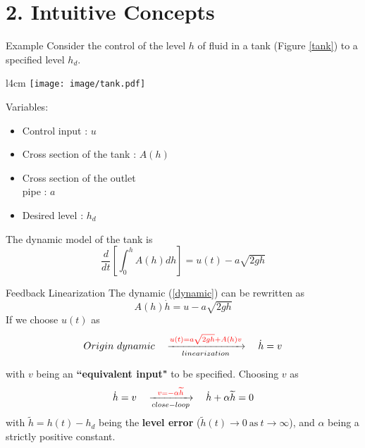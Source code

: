 \documentclass{beamer}
\begin{document}
  \section{2. Intuitive Concepts}

  \begin{frame}{Example}
    Consider the control of the level $h$ of fluid in a tank (Figure \ref{tank}) to a specified level $h_{d}$.

    \begin{wrapfigure}{l}{4cm}
    \vspace{-10pt}
    \texttt{[image: image/tank.pdf]}\\
    \vspace{-15pt}
    \caption{Fluid level control in a tank}\label{tank}
    \vspace{-10pt}
    \end{wrapfigure}

    Variables:
    \begin{itemize}
      \item Control input : $u$
      \item Cross section of the tank : $A(h)$
      \item Cross section of the outlet \\ pipe : $a$
      \item Desired level : $h_{d}$
    \end{itemize}

    The dynamic model of the tank is
    \begin{equation}\label{dynamic}
      \frac{d}{dt}\left[\int_{0}^{h}A(h)dh\right] = u(t) - a \sqrt{2gh}
    \end{equation}

  \end{frame}


  \begin{frame}{Feedback Linearization}
  The dynamic (\ref{dynamic}) can be rewritten as
  $$ A(h)\dot{h} = u-a\sqrt{2gh} $$
  If we choose $u(t)$ as
  $$
  Origin~dynamic \quad \xrightarrow[linearization]{{\color{red} u(t) = a\sqrt{2gh} + A(h)v}} \quad \dot{h}=v
  $$

  with $v$ being an \textbf{``equivalent input"} to be specified.
  Choosing $v$ as
  $$
   \dot{h}=v \quad \xrightarrow[close-loop]{{\color{red} v=-\alpha \widetilde{h}}} \quad \dot{h}+\alpha \widetilde{h}=0
  $$
  with $\widetilde{h} = h(t)-h_{d}$ being the \textbf{level error} ($\widetilde{h}(t)\rightarrow 0 ~\text{as}~ t \rightarrow \infty$), and $\alpha$ being a strictly positive constant.
  \end{frame}
\end{document}
